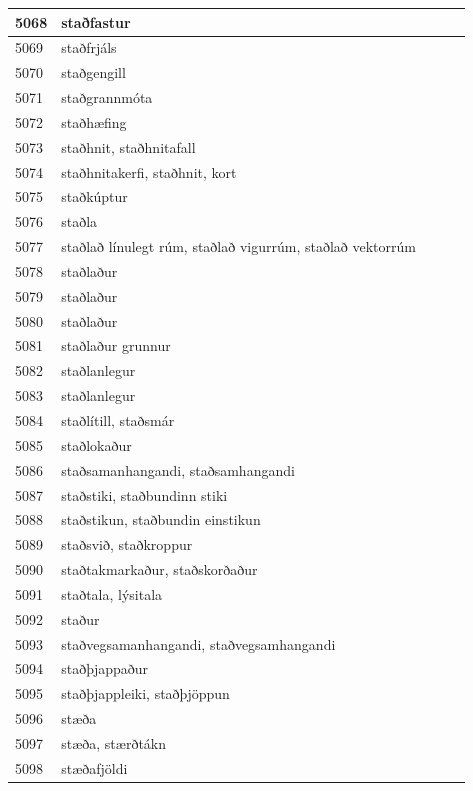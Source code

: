 \begin{longtable}{p{}|p{}|p{}|p{}|p{}}
\hline
5068 & staðfastur &  &  &  \\
\hline
5069 & staðfrjáls &  &  &  \\
\hline
5070 & staðgengill &  &  &  \\
\hline
5071 & staðgrannmóta &  &  &  \\
\hline
5072 & staðhæfing &  &  &  \\
\hline
5073 & staðhnit, staðhnitafall &  &  &  \\
\hline
5074 & staðhnitakerfi, staðhnit, kort &  &  &  \\
\hline
5075 & staðkúptur &  &  &  \\
\hline
5076 & staðla &  &  &  \\
\hline
5077 & staðlað línulegt rúm, staðlað vigurrúm, staðlað vektorrúm &  &  &  \\
\hline
5078 & staðlaður &  &  &  \\
\hline
5079 & staðlaður &  &  &  \\
\hline
5080 & staðlaður &  &  &  \\
\hline
5081 & staðlaður grunnur &  &  &  \\
\hline
5082 & staðlanlegur &  &  &  \\
\hline
5083 & staðlanlegur &  &  &  \\
\hline
5084 & staðlítill, staðsmár &  &  &  \\
\hline
5085 & staðlokaður &  &  &  \\
\hline
5086 & staðsamanhangandi, staðsamhangandi &  &  &  \\
\hline
5087 & staðstiki, staðbundinn stiki &  &  &  \\
\hline
5088 & staðstikun, staðbundin einstikun &  &  &  \\
\hline
5089 & staðsvið, staðkroppur &  &  &  \\
\hline
5090 & staðtakmarkaður, staðskorðaður &  &  &  \\
\hline
5091 & staðtala, lýsitala &  &  &  \\
\hline
5092 & staður &  &  &  \\
\hline
5093 & staðvegsamanhangandi, staðvegsamhangandi &  &  &  \\
\hline
5094 & staðþjappaður &  &  &  \\
\hline
5095 & staðþjappleiki, staðþjöppun &  &  &  \\
\hline
5096 & stæða &  &  &  \\
\hline
5097 & stæða, stærðtákn &  &  &  \\
\hline
5098 & stæðafjöldi &  &  &  \\

\end{longtable}
